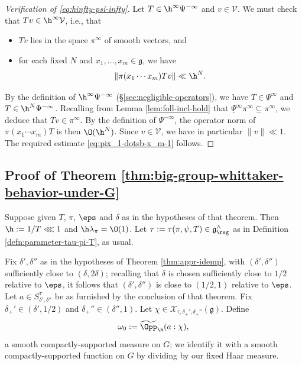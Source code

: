 \begin{proof}[Verification of \eqref{eq:hinfty-psi-infty}]
  Let $T \in \h^\infty \Psi^{-\infty}$ and $v \in \mathcal{V}$.  We must check that $T v \in \h^\infty \mathcal{V}$, i.e., that
  \begin{itemize}
  \item $T v$ lies in the space $\pi^\infty$ of smooth vectors, and
  \item for each fixed $N$ and $x_1,\dotsc,x_m \in \mathfrak{g}$, we have
    \begin{equation}\label{eq:pix_1-dotsb-x_m-1}
      \|\pi(x_1 \dotsb x_m) T v \| \ll \h^N.
    \end{equation}
  \end{itemize}
  By the definition of $\h^\infty \Psi^{-\infty}$ (\S\ref{sec:negligible-operators}), we have $T \in \underline{\Psi }^{\infty}$ and $T \in \h^N \Psi^{-\infty}$.  Recalling from Lemma \ref{lem:foll-incl-hold} that $\underline{\Psi }^{\infty} \pi^\infty \subseteq \pi^\infty$, we deduce that $T v \in \pi^\infty$.  By the definition of $\Psi^{-\infty}$, the operator norm of $\pi(x_1 \dotsb x_m) T$ is then $\O(\h^N)$.  Since $v \in \mathcal{V}$, we have in particular $\|v\| \ll 1$.  The required estimate \eqref{eq:pix_1-dotsb-x_m-1} follows.
\end{proof}


\subsection{Proof of Theorem \ref{thm:big-group-whittaker-behavior-under-G}}\label{sec:proof-theor-refthm:b}
Suppose given $T$, $\pi$, $\eps$ and $\delta$ as in the hypotheses of that theorem.  Then $\h := 1/T \lll 1$ and $\h \lambda_\pi = \O(1)$.  Let $\tau := \tau(\pi,\psi,T) \in \mathfrak{g}^\wedge_{\reg}$ as in Definition \ref{defn:parameter-tau-pi-T}, as usual.

Fix $\delta ', \delta ''$ as in the hypotheses of Theorem \ref{thm:appr-idemp}, with $(\delta ', \delta '')$ sufficiently close to $(\delta , 2 \delta)$; recalling that $\delta$ is chosen sufficiently close to $1/2$ relative to $\eps$, it follows that $(\delta ', \delta '')$ is close to $(1/2,1)$ relative to $\eps$.  Let $a \in S^{\tau}_{\delta ', \delta ''}$ be as furnished by the conclusion of that theorem.  Fix $\delta_+' \in (\delta ', 1/2)$ and $\delta_+'' \in (\delta '', 1)$.  Let $\chi \in \mathcal{X}_{\tau, \delta_+', \delta_+''}(\mathfrak{g})$.  Define
\begin{equation*}
  \omega_0 := \widetilde{\Opp}_{\h}(a:\chi),
\end{equation*}
a smooth compactly-supported measure on $G$; we identify it with a smooth compactly-supported function on $G$ by dividing by our fixed Haar measure.

